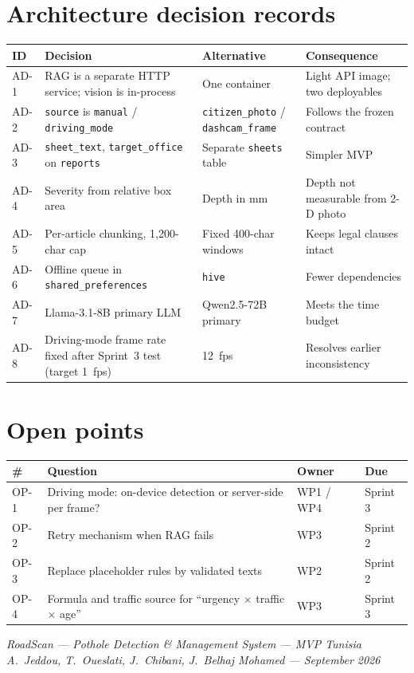 \documentclass[11pt,a4paper,oneside]{report}
\begin{document}
\section{Architecture decision records}
\begin{longtable}{@{}L{1.3cm}L{5.4cm}L{3.4cm}L{3.9cm}@{}}
\toprule\textbf{ID} & \textbf{Decision} & \textbf{Alternative} & \textbf{Consequence}\\\midrule\endhead
AD-1 & RAG is a separate HTTP service; vision is in-process & One container & Light API image; two deployables\\
AD-2 & \texttt{source} is \texttt{manual} / \texttt{driving\_mode} & \texttt{citizen\_photo} / \texttt{dashcam\_frame} & Follows the frozen contract\\
AD-3 & \texttt{sheet\_text}, \texttt{target\_office} on \texttt{reports} & Separate \texttt{sheets} table & Simpler MVP\\
AD-4 & Severity from relative box area & Depth in mm & Depth not measurable from 2-D photo\\
AD-5 & Per-article chunking, 1{,}200-char cap & Fixed 400-char windows & Keeps legal clauses intact\\
AD-6 & Offline queue in \texttt{shared\_preferences} & \texttt{hive} & Fewer dependencies\\
AD-7 & Llama-3.1-8B primary LLM & Qwen2.5-72B primary & Meets the time budget\\
AD-8 & Driving-mode frame rate fixed after Sprint~3 test (target 1~fps) & 12~fps & Resolves earlier inconsistency\\\bottomrule
\end{longtable}

\section{Open points}
\begin{longtable}{@{}L{1.4cm}L{7.6cm}L{2.4cm}L{2.2cm}@{}}
\toprule\textbf{\#} & \textbf{Question} & \textbf{Owner} & \textbf{Due}\\\midrule\endhead
OP-1 & Driving mode: on-device detection or server-side per frame? & WP1 / WP4 & Sprint 3\\
OP-2 & Retry mechanism when RAG fails & WP3 & Sprint 2\\
OP-3 & Replace placeholder rules by validated texts & WP2 & Sprint 2\\
OP-4 & Formula and traffic source for ``urgency $\times$ traffic $\times$ age'' & WP3 & Sprint 3\\\bottomrule
\end{longtable}

\vfill
\begin{center}\small\itshape RoadScan --- Pothole Detection \& Management System --- MVP Tunisia\\
A.~Jeddou, T.~Oueslati, J.~Chibani, J.~Belhaj Mohamed --- September 2026\end{center}
\end{document}
